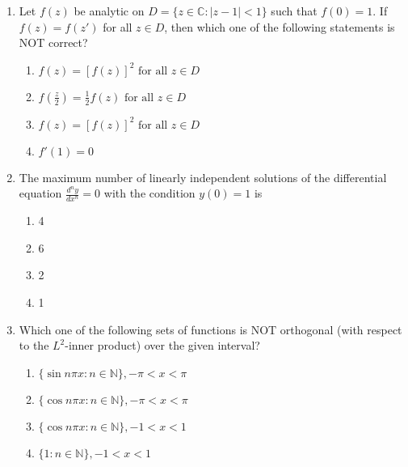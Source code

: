 \documentclass[journal]{IEEEtran}
\numberwithin{equation}{enumi}
\numberwithin{figure}{enumi}
\begin{document}
\begin{enumerate}
    \item Let $f(z)$ be analytic on $D = \{z \in \mathbb{C} : |z - 1| < 1\}$ such that $f(0) = 1$. If $f(z) = f(z')$ for all $z \in D$, then which one of the following statements is NOT correct?

    \begin{multicols}{4}
    \begin{enumerate}
        \item $f(z) = [f(z)]^2 \text{ for all } z \in D$
        \item $f\left(\frac{z}{2}\right) = \frac{1}{2} f(z) \text{ for all } z \in D$
        \item $f(z) = [f(z)]^2 \text{ for all } z \in D$
        \item $f'(1) = 0$
    \end{enumerate}
    \end{multicols}

    \item The maximum number of linearly independent solutions of the differential equation $\frac{d^n y}{dx^n} = 0$ with the condition $y(0) = 1$ is

    \begin{multicols}{4}
    \begin{enumerate}
        \item 4
        \item 6
        \item 2
        \item 1
    \end{enumerate}
    \end{multicols}

    \item Which one of the following sets of functions is NOT orthogonal (with respect to the $L^2$-inner product) over the given interval?

    \begin{multicols}{4}
    \begin{enumerate}
        \item $\{\sin n\pi x : n \in \mathbb{N}\}, -\pi < x < \pi$
        \item $\{\cos n\pi x : n \in \mathbb{N}\}, -\pi < x < \pi$
        \item $\{\cos n\pi x : n \in \mathbb{N}\}, -1 < x < 1$
        \item $\{1 : n \in \mathbb{N}\}, -1 < x < 1$
    \end{enumerate}
    \end{multicols}


\end{enumerate}
\end{document}
